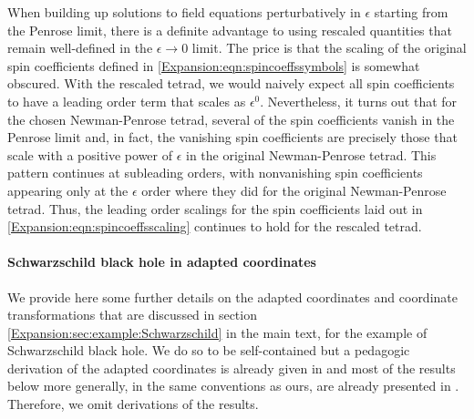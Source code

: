 	When building up solutions to field equations perturbatively in $\epsilon$ starting from the Penrose limit, there is a definite advantage
	to using rescaled quantities that remain well-defined in the $\epsilon \to 0$ limit. The price is that the scaling of the original spin coefficients defined in \eqref{Expansion:eqn:spincoeffssymbols} is somewhat obscured. With the rescaled
	tetrad, we would naively expect all spin coefficients to have a leading order term that scales as $\epsilon^{0}$.
	Nevertheless, it turns out that for the chosen Newman-Penrose tetrad, several of the spin coefficients vanish in the
	Penrose limit and, in fact, the vanishing spin coefficients are precisely those that scale with a positive
	power of $\epsilon$ in the original Newman-Penrose tetrad. This pattern continues at subleading orders, with
	nonvanishing spin coefficients appearing only at the $\epsilon$ order where they did for the original
	Newman-Penrose tetrad. Thus, the leading order scalings for the spin coefficients laid out in
	\eqref{Expansion:eqn:spincoeffsscaling} continues to hold for the rescaled tetrad.
	
	\paragraph*{Schwarzschild black hole in adapted coordinates} 
	
	We provide here some further details on the adapted coordinates and coordinate transformations that are discussed in section \ref{Expansion:sec:example:Schwarzschild} in the main text, for the example of Schwarzschild black hole. We do so to be self-contained but a pedagogic derivation of the adapted coordinates is already given in \cite{blau2011plane} and most of the results below more generally, in the same conventions as ours, are already presented in \cite{Chawla:2024mse}. Therefore, we omit derivations of the results.
	
